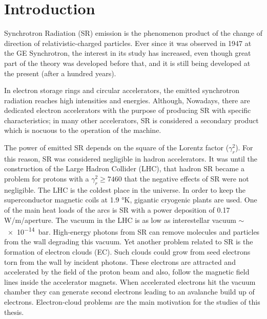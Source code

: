 
\chapter*{Introduction} %
\label{intro} %



Synchrotron Radiation (SR) emission is the phenomenon
product of the change of direction of relativistic-charged particles.  Ever
since it was observed in 1947 at the GE Synchrotron,  the
interest in its study has increased, even though great part of the theory was
developed before that, and it is still being developed at the present (after a
hundred years).

In electron storage rings and circular accelerators, the emitted synchrotron
radiation reaches high intensities and energies. Although, Nowadays, there are
dedicated electron accelerators with the purpose of producing SR with specific
characteristics; in many other accelerators, SR is considered a secondary
product which is nocuous to the operation of the machine.

The power of emitted SR depends on the square of the Lorentz factor
(\(\gamma_r^{2}\)). For this reason, SR was considered negligible in hadron
accelerators. It was until the construction of the Large Hadron Collider (LHC),
that hadron SR became a problem for protons with a \(\gamma_r^{2}\geq 7460\)
that the negative effects of SR were not negligible. The LHC is the coldest
place in the universe. In order to keep the superconductor magnetic coils at 1.9
°K, gigantic cryogenic plants are used. One of the main heat loads of the arcs
is SR with a power deposition of 0.17 W/m/aperture. The vacuum in the LHC is as
low as interestellar vacuum $\sim$\SI{e-14}{bar}. High-energy photons from SR can
remove molecules and particles from the wall degrading this vacuum.  Yet another
problem related to SR is the formation of electron clouds (EC). Such clouds
could grow from seed electrons torn from the wall by incident photons. These
electrons are attracted and accelerated by the field of the proton beam and
also, follow the magnetic field lines inside the accelerator magnets. When
accelerated electrons hit the vacuum chamber they can generate second electrons
leading to an avalanche build up of electrons. Electron-cloud problems are the
main motivation for the studies of this thesis.

